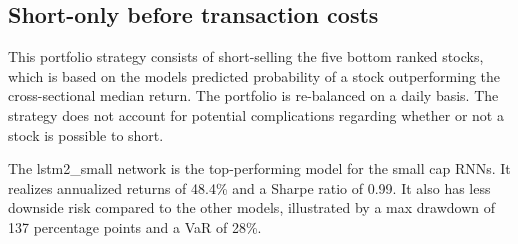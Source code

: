 \subsection{Short-only before transaction costs}
This portfolio strategy consists of short-selling the five bottom ranked stocks, which is based on the models predicted probability of a stock outperforming the cross-sectional median return. The portfolio is re-balanced on a daily basis. The strategy does not account for potential complications regarding whether or not a stock is possible to short. 
\indent\newline     
\begin{table}[ht]
\centering
{}
\caption{Small cap trading performance short-only (K=5)}
\end{table}
\indent\newline     
The lstm2\_small network is the top-performing model for the small cap RNNs. It realizes annualized returns of 48.4\% and a Sharpe ratio of 0.99. It also has less downside risk compared to the other models, illustrated by a max drawdown of 137 percentage points and a VaR of 28\%.
\indent\newline 
